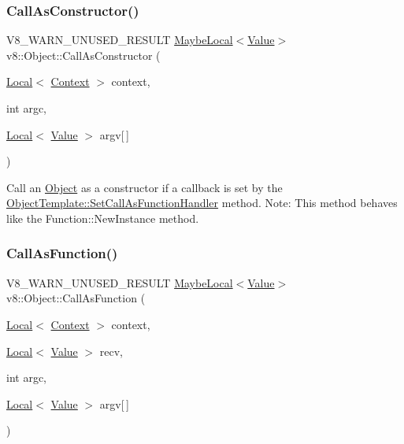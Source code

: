 \subsubsection{\texorpdfstring{Call\+As\+Constructor()}{CallAsConstructor()}}
{\footnotesize\ttfamily V8\+\_\+\+W\+A\+R\+N\+\_\+\+U\+N\+U\+S\+E\+D\+\_\+\+R\+E\+S\+U\+LT \mbox{\hyperlink{classv8_1_1MaybeLocal}{Maybe\+Local}}$<$\mbox{\hyperlink{classv8_1_1Value}{Value}}$>$ v8\+::\+Object\+::\+Call\+As\+Constructor (\begin{DoxyParamCaption}\item[{\mbox{\hyperlink{classv8_1_1Local}{Local}}$<$ \mbox{\hyperlink{classv8_1_1Context}{Context}} $>$}]{context,  }\item[{int}]{argc,  }\item[{\mbox{\hyperlink{classv8_1_1Local}{Local}}$<$ \mbox{\hyperlink{classv8_1_1Value}{Value}} $>$}]{argv\mbox{[}$\,$\mbox{]} }\end{DoxyParamCaption})}

Call an \mbox{\hyperlink{classv8_1_1Object}{Object}} as a constructor if a callback is set by the \mbox{\hyperlink{classv8_1_1ObjectTemplate_a1775c8f73e643c339804d2f5b628eddf}{Object\+Template\+::\+Set\+Call\+As\+Function\+Handler}} method. Note\+: This method behaves like the Function\+::\+New\+Instance method. \mbox{\label{classv8_1_1Object_aec7375fe34a800baac4e26deb33ccac0}} 
\subsubsection{\texorpdfstring{Call\+As\+Function()}{CallAsFunction()}}
{\footnotesize\ttfamily V8\+\_\+\+W\+A\+R\+N\+\_\+\+U\+N\+U\+S\+E\+D\+\_\+\+R\+E\+S\+U\+LT \mbox{\hyperlink{classv8_1_1MaybeLocal}{Maybe\+Local}}$<$\mbox{\hyperlink{classv8_1_1Value}{Value}}$>$ v8\+::\+Object\+::\+Call\+As\+Function (\begin{DoxyParamCaption}\item[{\mbox{\hyperlink{classv8_1_1Local}{Local}}$<$ \mbox{\hyperlink{classv8_1_1Context}{Context}} $>$}]{context,  }\item[{\mbox{\hyperlink{classv8_1_1Local}{Local}}$<$ \mbox{\hyperlink{classv8_1_1Value}{Value}} $>$}]{recv,  }\item[{int}]{argc,  }\item[{\mbox{\hyperlink{classv8_1_1Local}{Local}}$<$ \mbox{\hyperlink{classv8_1_1Value}{Value}} $>$}]{argv\mbox{[}$\,$\mbox{]} }\end{DoxyParamCaption})}


